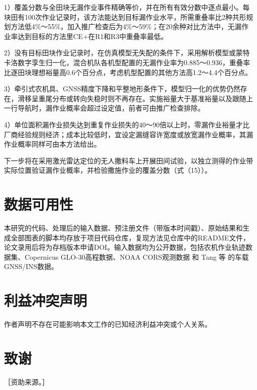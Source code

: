 \documentclass[preprint,12pt,number,sort&compress]{elsarticle}
\begin{document}
1）覆盖分数与全田块无漏作业事件精确等价，并在所有有效分数中逐点最小。每块田有100次作业记录时，该方法能达到目标漏作业水平，所需重叠率比2种共形规划方法低4\%～55\%，加入推广检查后为4\%～59\%；在20余种对比方法中，无漏作业率达到目标的方法里CE+在R1和R3中重叠率最低。

2）没有目标田块作业记录时，在仿真模型无失配的条件下，采用解析模型或蒙特卡洛数字孪生归一化，混合机队各机型配置的无漏作业率为0.885～0.936，重叠率比逐田块理想裕量高0.6个百分点，考虑机型配置的其他方法高1.2～4.4个百分点。

3）牵引式农机具、GNSS精度下降和平整地形条件下，模型归一化的优势仍然存在，滑移呈重尾分布或转向失稳时则不再存在。实施裕量大于基准裕量以及跟随上一行导航时，漏作业概率会超过设定值，前者可由推广检查排除。

4）单位面积漏作业损失达到重复作业损失的40～90倍以上时，零漏作业裕量才比厂商经验规则经济；成本比较低时，宜设定漏缝容许宽度或放宽漏作业概率，其漏作业概率同样可由本方法给出。

下一步将在采用激光雷达定位的无人撒料车上开展田间试验，以独立测得的作业带实际位置验证漏作业概率，并检验撒施作业的覆盖分数（式（15））。


\section*{数据可用性}
本研究的代码、处理后的输入数据、预注册文件（带版本时间戳）、原始结果和生成全部图表的脚本均存放于项目代码仓库，复现方法见仓库中的README文件，论文录用后将为存档版本申请DOI。输入数据均为公开数据，包括农机作业轨迹数据集\citep{wu2023}、Copernicus GLO-30高程数据\citep{esa2021}、NOAA CORS观测数据\citep{noaacors} 和 Tang 等\citep{tang2022} 的车载GNSS/INS数据。

\section*{利益冲突声明}
作者声明不存在可能影响本文工作的已知经济利益冲突或个人关系。

\section*{致谢}
［资助来源。］
\end{document}
